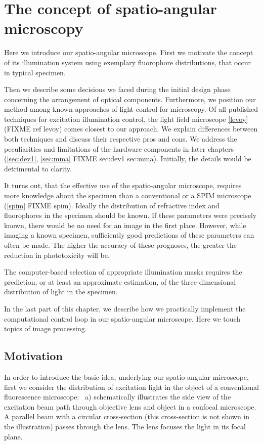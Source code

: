 \chapter{The concept of spatio-angular microscopy}
\label{sec:concept}
\begin{summary}
  Here we introduce our spatio-angular microscope. First we motivate
  the concept of its illumination system using exemplary fluorophore
  distributions, that occur in typical specimen.

  Then we describe some decisions we faced during the initial design
  phase concerning the arrangement of optical components. Furthermore,
  we position our method among known approaches of light control for
  microscopy. Of all published techniques for excitation illumination
  control, the light field microscope \ref{levoy} (FIXME ref levoy)
  comes closest to our approach.  We explain differences between both
  techniques and discuss their respective pros and cons.  We address
  the peculiarities and limitations of the hardware components in
  later chapters (\ref{sec:dev1}, \ref{sec:mma} FIXME sec:dev1
  sec:mma).  Initially, the details would be detrimental to clarity.

  It turns out, that the effective use of the spatio-angular
  microscope, requires more knowledge about the specimen than a
  conventional or a SPIM microscope (\ref{spim} FIXME spim). Ideally the
  distribution of refractive index and fluorophores in the specimen
  should be known. If these parameters were precisely known, there
  would be no need for an image in the first place. However, while
  imaging a known specimen, sufficiently good predictions of these
  parameters can often be made. The higher the accuracy of these
  prognoses, the greater the reduction in phototoxicity will be.

  The computer-based selection of appropriate illumination masks
  requires the prediction, or at least an approximate estimation, of
  the three-dimensional distribution of light in the specimen.

  In the last part of this chapter, we describe how we practically
  implement the computational control loop in our spatio-angular
  microscope. Here we touch topics of image processing.
\end{summary}
\section{Motivation}
In order to introduce the basic idea, underlying our spatio-angular
microscope, first we consider the distribution of excitation light in
the object of a conventional fluorescence microscope:
~a) schematically illustrates the side view
of the excitation beam path through objective lens and object in a
confocal microscope. A parallel beam with a circular cross-section
(this cross-section is not shown in the illustration) passes through
the lens. The lens focuses the light in its focal plane.

